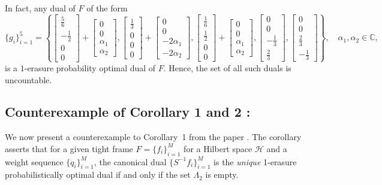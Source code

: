 \documentclass[final,1p,times]{elsarticle}
\begin{document}
In fact, any dual of $F$ of the form
\[
\{g_i\}_{i=1}^5 = \left\{
\begin{bmatrix} \frac{5}{6} \\ -\frac{1}{2} \\ 0 \\ 0 \end{bmatrix} + \begin{bmatrix} 0 \\ 0 \\ \alpha_1 \\ \alpha_2 \end{bmatrix},
\begin{bmatrix} \frac{1}{3} \\ 0 \\ 0 \\ 0 \end{bmatrix} + \begin{bmatrix} 0 \\ 0 \\ -2\alpha_1 \\ -2\alpha_2 \end{bmatrix},
\begin{bmatrix} \frac{1}{6} \\ \frac{1}{2} \\ 0 \\ 0 \end{bmatrix} + \begin{bmatrix} 0 \\ 0 \\ \alpha_1 \\ \alpha_2 \end{bmatrix},
\begin{bmatrix} 0 \\ 0 \\ -\frac{1}{3} \\ \frac{2}{3} \end{bmatrix},
\begin{bmatrix} 0 \\ 0 \\ \frac{2}{3} \\ -\frac{1}{3} \end{bmatrix}
\right\}, \quad \alpha_1, \alpha_2 \in \mathbb{C},
\]
is a $1$-erasure probability optimal dual of $F$. Hence, the set of all such duals is uncountable.






    

	

\subsection{Counterexample of Corollary 1 and 2 :}
We now present a counterexample to Corollary~1 from the paper \cite{li1}. The corollary asserts that for a given tight frame $F = \{f_i\}_{i=1}^M$ for a Hilbert space $\mathcal{H}$ and a weight sequence $\{q_i\}_{i=1}^M$, the canonical dual $\{S^{-1}f_i\}_{i=1}^M$ is the \emph{unique} 1-erasure probabilistically optimal dual if and only if the set $\Lambda_2$  is empty.
\end{document}
